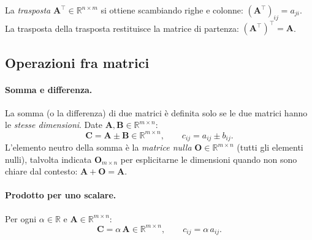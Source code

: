 La \textit{trasposta} $\bm{A}^\top \in \mathbb{R}^{n \times m}$ si ottiene
scambiando righe e colonne: $(\bm{A}^\top)_{ij} = a_{ji}$.  La trasposta della trasposta restituisce la matrice di partenza:
$(\bm{A}^\top)^\top = \bm{A}$. 


\subsection{Operazioni fra matrici}

\paragraph{Somma e differenza.}
La somma (o la differenza) di due matrici \`e definita solo se le due matrici hanno le \textit{stesse dimensioni}. Date $\bm{A}, \bm{B} \in \mathbb{R}^{m \times n}$:
\begin{equation}
	\bm{C} = \bm{A} \pm \bm{B} \in \mathbb{R}^{m \times n}, \qquad c_{ij} = a_{ij} \pm b_{ij}.
\end{equation}
L'elemento neutro della somma \`e la \textit{matrice nulla}
$\bm{O}\in\mathbb{R}^{m\times n}$ (tutti gli elementi nulli), talvolta indicata $\bm{O}_{m\times n}$ per esplicitarne le dimensioni quando non sono chiare dal contesto: $\bm{A}+\bm{O}=\bm{A}$.

\paragraph{Prodotto per uno scalare.}
Per ogni $\alpha \in \mathbb{R}$ e $\bm{A} \in \mathbb{R}^{m \times n}$:
\begin{equation}
	\bm{C} = \alpha\,\bm{A} \in \mathbb{R}^{m \times n}, \qquad c_{ij} = \alpha\, a_{ij}.
\end{equation}


